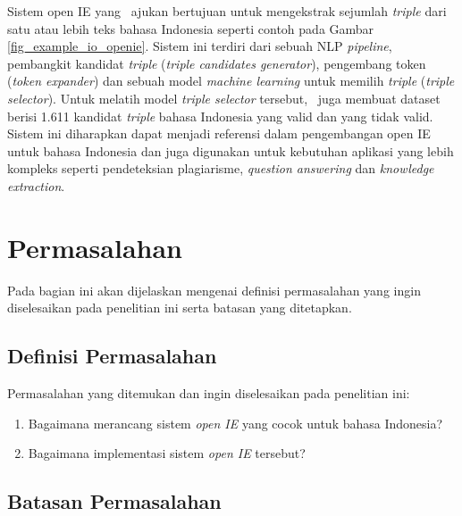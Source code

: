 Sistem open IE yang \saya~ajukan bertujuan untuk mengekstrak sejumlah \textit{triple} dari satu atau lebih teks bahasa Indonesia seperti contoh pada Gambar \ref{fig_example_io_openie}. Sistem ini terdiri dari sebuah NLP \textit{pipeline}, pembangkit kandidat \textit{triple} (\textit{triple candidates generator}), pengembang token (\textit{token expander}) dan sebuah model \textit{machine learning} untuk memilih \textit{triple} (\textit{triple selector}). Untuk melatih model \textit{triple selector} tersebut, \saya~juga membuat dataset berisi 1.611 kandidat \textit{triple} bahasa Indonesia yang valid dan yang tidak valid. Sistem ini diharapkan dapat menjadi referensi dalam pengembangan open IE untuk bahasa Indonesia dan juga digunakan untuk kebutuhan aplikasi yang lebih kompleks seperti pendeteksian plagiarisme, \textit{question answering} dan \textit{knowledge extraction}.

\section{Permasalahan}
Pada bagian ini akan dijelaskan mengenai definisi permasalahan yang ingin diselesaikan pada penelitian ini serta batasan yang ditetapkan.


\subsection{Definisi Permasalahan}

Permasalahan yang ditemukan dan ingin diselesaikan pada penelitian ini:

\begin{enumerate}
\item Bagaimana merancang sistem \textit{open IE} yang cocok untuk bahasa Indonesia?
\item Bagaimana implementasi sistem \textit{open IE} tersebut?
\end{enumerate}

\subsection{Batasan Permasalahan}

